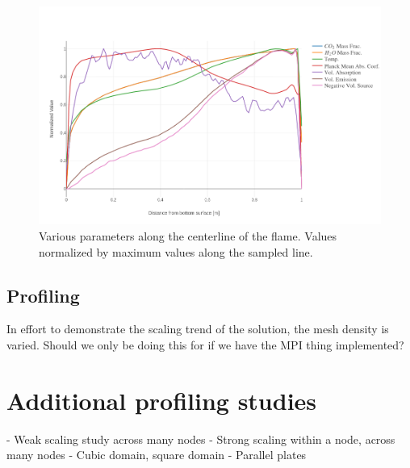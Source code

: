 \begin{figure}
\includegraphics[width=\linewidth]{figures/ch4/line_plot.png}
\caption{Various parameters along the centerline of the flame. Values normalized by maximum values along the sampled line.}
\label{fig:PoolFire_lineplot}
\end{figure}

\subsection{Profiling}
In effort to demonstrate the scaling trend of the solution, the mesh density is varied. 
Should we only be doing this for if we have the MPI thing implemented?

\section{Additional profiling studies}


- Weak scaling study across many nodes
- Strong scaling within a node, across many nodes
    - Cubic domain, square domain
    - Parallel plates
    
